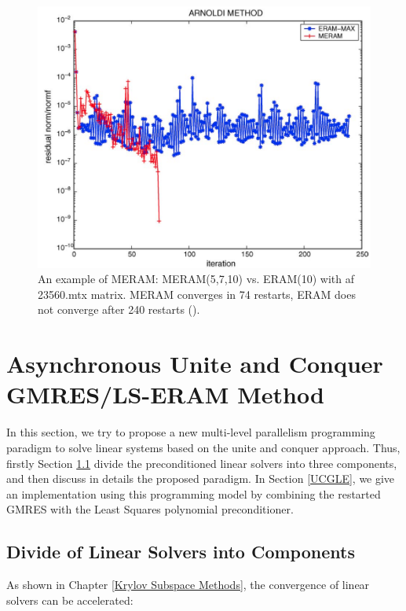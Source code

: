 \begin{figure}[t]
	\centering
	\includegraphics[width=6.2in]{fig/meram_perf.png}
	\caption{An example of MERAM: MERAM(5,7,10) vs. ERAM(10) with af 23560.mtx matrix. MERAM converges in 74 restarts, ERAM does not converge after 240 restarts (\cite{emad2005multiple}).}
	\label{meram-perf}
\end{figure}

\section{Asynchronous Unite and Conquer GMRES/LS-ERAM Method}

In this section, we try to propose a new multi-level parallelism programming paradigm to solve linear systems based on the unite and conquer approach. Thus, firstly Section \ref{Divide of Linear Solvers into Components} divide the preconditioned linear solvers into three components, and then discuss in details the proposed paradigm. In Section \ref{UCGLE}, we give an implementation using this programming model by combining the restarted GMRES with the Least Squares polynomial preconditioner.

\subsection{Divide of Linear Solvers into Components} \label{Divide of Linear Solvers into Components}

As shown in Chapter \ref{Krylov Subspace Methods}, the convergence of linear solvers can be accelerated: 


